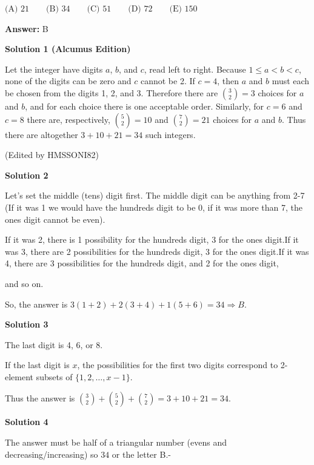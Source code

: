 \begin{enumerate}
 $\text {(A) } 21 \qquad \text {(B) } 34 \qquad \text {(C) } 51 \qquad \text {(D) } 72 \qquad \text {(E) } 150$

 \textbf{Answer: }B



\textbf{Solution 1 (Alcumus Edition)}

Let the integer have digits $a$, $b$, and $c$, read left to right. Because $1 \leq a<b<c$, none of the digits can be zero and $c$ cannot be 2. If $c=4$, then $a$ and $b$ must each be chosen from the digits 1, 2, and 3. Therefore there are $\binom{3}{2}=3$ choices for $a$ and $b$, and for each choice there is one acceptable order. Similarly, for $c=6$ and $c=8$ there are, respectively, $\binom{5}{2}=10$ and $\binom{7}{2}=21$ choices for $a$ and $b$. Thus there are altogether $3+10+21=\boxed{34}$ such integers.

 


 (Edited by HMSSONI82)

 



\textbf{Solution 2}

Let's set the middle (tens) digit first. The middle digit can be anything from 2-7 (If it was 1 we would have the hundreds digit to be 0, if it was more than 7, the ones digit cannot be even).

 If it was 2, there is 1 possibility for the hundreds digit, 3 for the ones digit.If it was 3, there are 2 possibilities for the hundreds digit, 3 for the ones digit.If it was 4, there are 3 possibilities for the hundreds digit, and 2 for the ones digit,

 and so on.

 So, the answer is $3(1+2)+2(3+4)+1(5+6)=\boxed{34} \Rightarrow B$.

 



\textbf{Solution 3}

The last digit is 4, 6, or 8.

 If the last digit is $x$, the possibilities for the first two digits correspond to 2-element subsets of $\{1,2,\dots,x-1\}$.

 Thus the answer is ${3\choose 2} + {5\choose 2} + {7\choose 2} = 3 + 10 + 21 = \boxed{34}$.

 



\textbf{Solution 4}

The answer must be half of a triangular number (evens and decreasing/increasing) so $\boxed{34}$ or the letter B.-


\end{enumerate}
